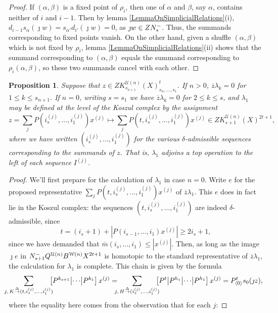 \documentclass[11pt]{amsart}
\theoremstyle{plain}
\newtheorem{prop}[thm]{Proposition}
\theoremstyle{definition}
\newcommand{\calW}{\mathcal{W}}
\newcommand{\calU}{\mathcal{U}}
\theoremstyle{plain}
\newcommand{\deltaalg}{\Delta} %
\newcommand{\minDimP}{\overline{m}}
\newcommand{\produces}[3]{#3:#1\sim #2}
\renewcommand{\produces}[3]{#1\rightarrow_{#3} #2}%
\renewcommand{\produces}[3]{#1\overset{\smash{#3}}{\rightarrow} #2}%
\newcommand{\Nop}{N^{\smash{-}}}
\begin{document}
\begin{Koszul complexes}
\begin{proof}
If $(\alpha,\beta)$ is a fixed point of $\rho_i$, then one of $\alpha$ and $\beta$, say $\alpha$, contains neither of $i$ and $i-1$. Then by lemma \ref{LemmaOnSimplicialRelations}(i), $d_{i-1}s_\alpha(\jmath w)=s_{\alpha'}d_{i'}(\jmath w)=0$, as $\jmath w\in Z\Nop_*$. Thus, the summands corresponding to fixed points vanish.
On the other hand, given a shuffle $(\alpha,\beta)$ which is not fixed by $\rho_i$, lemma \ref{LemmaOnSimplicialRelations}(ii) shows that the summand corresponding to $(\alpha,\beta)$ equals the summand corresponding to $\rho_i(\alpha,\beta)$, so these two summands cancel with each other.
\end{proof}
\begin{prop}\label{QkTrivial}
Suppose that $z\in ZK^{\calU(n)}_{s_{n+1}}(X)_{s_n,\ldots,s_1}^t$. If $n>0$, $\overline{z}\lambda_k=0$ for $1\leq k\leq {s_{n+1}}$. If $n=0$, writing $s=s_1$ we have $\overline{z}\lambda_k=0$ for $2\leq k\leq {s}$, and $\lambda_1$ may be defined at the level of the Koszul complex by the assignment
\[z=\textstyle\sum_{j}P(i_{s}^{(j)},\ldots,i_1^{(j)})x^{(j)}{\longmapsto}\textstyle\sum_{j}P(t,i_{s}^{(j)},\ldots,i_1^{(j)})x^{(j)}\in ZK^{\calU(n)}_{s+1}(X)^{2t+1},\]
where we have written $(i_{s}^{(j)},\ldots,i_1^{(j)})$ for the various $\delta$-admissible sequences corresponding to the summands of $z$. That is, $\lambda_1$ adjoins a top operation to the left of each sequence $I^{(j)}$.
\end{prop}
\begin{proof}
We'll first prepare for the calculation of $\lambda_1$ in case $n=0$.
Write $e$ for the proposed representative $\sum_{j}P(t,i_{s}^{(j)},\ldots,i_1^{(j)})x^{(j)}$ of $\overline{z}\lambda_1$. This $e$ does in fact lie in the Koszul complex: the sequences $(t,i_{s}^{(j)},\ldots,i_1^{(j)})$ are indeed $\delta$-admissible, since
\[t=(i_{s}+1)+|P(i_{s-1},\ldots,i_1)x^{(j)}|\geq2i_{s}+1,\]
since we have demanded that $\minDimP(i_{s},\ldots,i_1)\leq|x^{(j)}|$. Then, as long as the image $\jmath e$ in $\Nop_{s+1}Q^{\calU(n)}B^{\calW(n)}X^{2t+1}$ is homotopic to the standard representative of $\overline{z}\lambda_1$, the calculation for $\lambda_1$ is complete. This chain is given by the formula
\[\!\!\!\!\sum_{j,\,\produces{K}{(t,i_{s}^{(j)},\ldots,i_1^{(j)})}{\deltaalg}}\!\!\!\!\left[P^{k_{s+1}} \middle|\cdots\middle|P^{k_1} \right]x^{(j)}
 =\!\!\!\!\sum_{j,\,\produces{H}{(i_{s}^{(j)},\ldots,i_1^{(j)})}{\deltaalg}}\!\!\!\!\left[P^t\middle|P^{h_{s}} \middle|\cdots\middle|P^{h_1} \right]x^{(j)}=P^{t}_{\langle 0\rangle}s_0(\jmath z),\]
where the equality here comes from the observation that for each $j$:

\end{proof}
\end{Koszul complexes}
\end{document}
